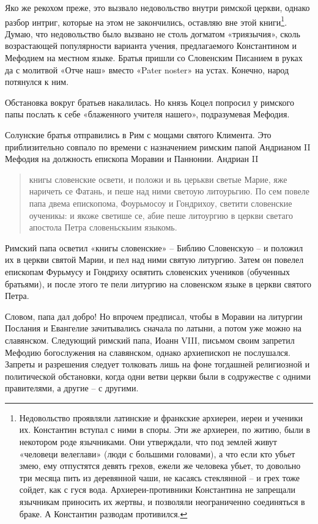 \documentclass[a5paper,11pt,openany]{article}
\begin{document}
Яко же рекохом преже, это вызвало недовольство внутри римской церкви, однако разбор интриг, которые на этом не закончились, оставляю вне этой книги\footnote{Недовольство проявляли латинские и франкские архиереи, иереи и ученики их. Константин вступал с ними в споры. Эти же архиереи, по житию, были в некотором роде язычниками. Они утверждали, что под землей живут «человеци велеглави» (люди с большими головами), а что если кто убьет змею, ему отпустятся девять грехов, ежели же человека убьет, то довольно три месяца пить из деревянной чаши, не касаясь стеклянной – и грех тоже сойдет, как с гуся вода. Архиереи-противники Константина не запрещали язычникам приносить их жертвы, и позволяли неограниченно соединяться в браке. А Константин разводам противился.}. Думаю, что недовольство было вызвано не столь догматом «триязычия», сколь возрастающей популярности варианта учения, предлагаемого Константином и Мефодием на местном языке. Братья пришли со Словенским Писанием в руках да с молитвой «Отче наш» вместо «Pater noster» на устах. Конечно, народ потянулся к ним.

Обстановка вокруг братьев накалилась. Но князь Коцел попросил у римского папы послать к себе «блаженного учителя нашего», подразумевая Мефодия.

Солунские братья отправились в Рим с мощами святого Климента. Это приблизительно совпало по времени с назначением римским папой Андрианом II Мефодия на должность епископа Моравии и Паннонии. Андриан II

\begin{quotation}
книгы словенские освети, и положи и вь церькви светые Марие, яже наричеть се Фатань, и пеше над ними светоую литоурьгию. По сем повеле папа двема епископома, Фоурьмосоу и Гондрихоу, светити словенские оученикы: и якоже светише се, абие пеше литоургию в церкви светаго апостола Петра словеньскыим языкомь.
\end{quotation}

Римский папа осветил «книгы словенские» –  Библию Словенскую – и положил их в церкви святой Марии, и пел над ними святую литургию. Затем он повелел епископам Фурьмусу и Гондриху освятить словенских учеников (обученных братьями), и после этого те пели литургию на словенском языке в церкви святого Петра.

Словом, папа дал добро! Но впрочем предписал, чтобы в Моравии на литургии Послания и Евангелие зачитывались сначала по латыни, а потом уже можно на славянском. Следующий римский папа, Иоанн VIII, письмом своим запретил Мефодию богослужения на славянском, однако архиепископ не послушался. Запреты и разрешения следует толковать лишь на фоне тогдашней религиозной и политической обстановки, когда одни ветви церкви были в содружестве с одними правителями, а другие – с другими.
\end{document}
